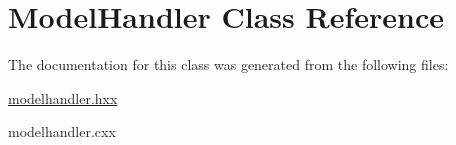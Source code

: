 \hypertarget{classModelHandler}{\section{Model\-Handler Class Reference}
\label{classModelHandler}
}


The documentation for this class was generated from the following files\-:\begin{DoxyCompactItemize}
\item 
\hyperlink{modelhandler_8hxx}{modelhandler.\-hxx}\item 
modelhandler.\-cxx\end{DoxyCompactItemize}
